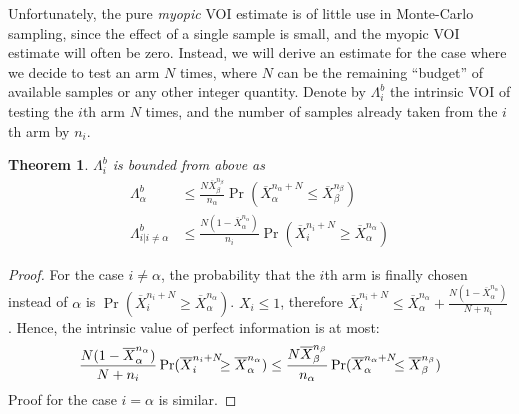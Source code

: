 \documentclass[]{article}
\newtheorem{thm}{Theorem}
\begin{document}
Unfortunately, the pure \textit{myopic} VOI estimate is of little use in
Monte-Carlo sampling, since the effect of a single sample is small,
and the myopic VOI estimate will often be zero. Instead, we will derive
an estimate for the case where we decide to test an arm $N$ times,
where $N$ can be the remaining ``budget'' of available samples or
any other integer quantity.
Denote by  $\Lambda_i^b$ the intrinsic VOI of testing the $i$th arm
$N$ times, and the number of
samples already taken from the $i$th arm by $n_i$.
\begin{thm} $\Lambda_i^b$ is bounded from above as
\begin{align}
\label{eqn:thm-be}
  \Lambda_\alpha^b&\le \frac {N \overline X_\beta^{n_\beta}} {n_\alpha} \Pr(\overline X_\alpha^{n_\alpha+N}\le\overline X_\beta^{n_\beta})\nonumber\\
\Lambda_{i|i\ne\alpha}^b&\le \frac {N(1-\overline X_\alpha^{n_\alpha})} {n_i}\Pr(\overline   X_i^{{n_i}+N}\ge\overline X_\alpha^{n_\alpha})
\end{align}
\label{thm:be}
\end{thm}
\vspace{-2em}
\begin{proof} For the case $i\ne \alpha$, the probability that the
  $i$th arm is finally chosen instead of $\alpha$ is
  $\Pr(\overline X_i^{n_i+N} \ge \overline X_\alpha^{n_\alpha})$. $X_i \le 1$,
  therefore $\overline X_i^{n_i+N}\le \overline
  X_\alpha^{n_\alpha}+\frac {N(1-\overline X_\alpha^{n_\alpha})} {N+n_i}$. Hence, the intrinsic value of perfect
  information is at most: 
\begin{equation}
\label{eq:simplistic}
\frac{ N(1-\overline  X_\alpha^{n_\alpha})}
  {N+n_i}\Pr(\overline X_i^{{n_i}+N}\hspace{-0.5em}\ge\overline X_\alpha^{n_\alpha})\le \frac {N \overline X_\beta^{n_\beta}} {n_\alpha} \Pr(\overline X_\alpha^{n_\alpha+N}\hspace{-0.5em}\le\overline X_\beta^{n_\beta})
\end{equation}
  Proof for the case $i=\alpha$ is similar.
\end{proof}
\end{document}
